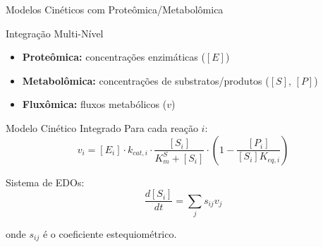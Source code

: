 \begin{frame}{Modelos Cinéticos com Proteômica/Metabolômica}
\begin{block}{Integração Multi-Nível}
\begin{itemize}
    \item \textbf{Proteômica:} concentrações enzimáticas ($[E]$)
    \item \textbf{Metabolômica:} concentrações de substratos/produtos ($[S]$, $[P]$)
    \item \textbf{Fluxômica:} fluxos metabólicos ($v$)
\end{itemize}
\end{block}

\vspace{0.2cm}

\begin{block}{Modelo Cinético Integrado}
Para cada reação $i$:
\begin{equation*}
v_i = [E_i] \cdot k_{cat,i} \cdot \frac{[S_i]}{K_m^S + [S_i]} \cdot \left(1 - \frac{[P_i]}{[S_i]K_{eq,i}}\right)
\end{equation*}

Sistema de EDOs:
\begin{equation*}
\frac{d[S_i]}{dt} = \sum_j s_{ij}v_j
\end{equation*}

onde $s_{ij}$ é o coeficiente estequiométrico.
\end{block}

\vspace{0.2cm}

\end{frame}

